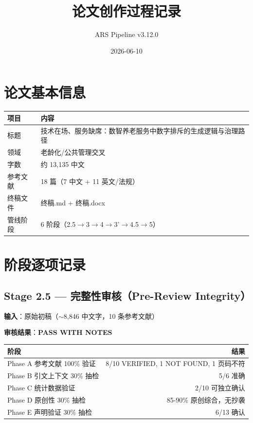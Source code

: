 \documentclass[12pt,a4paper]{article}
\title{论文创作过程记录}
\author{ARS Pipeline v3.12.0}
\date{2026-06-10}
\begin{document}
\maketitle
\tableofcontents
\newpage

\section{论文基本信息}

\begin{tabular}{ll}
\hline
\textbf{项目} & \textbf{内容} \\
\hline
标题 & 技术在场、服务缺席：数智养老服务中数字排斥的生成逻辑与治理路径 \\
领域 & 老龄化/公共管理交叉 \\
字数 & 约 13,135 中文 \\
参考文献 & 18 篇（7 中文 + 11 英文/法规） \\
终稿文件 & 终稿.md + 终稿.docx \\
管线阶段 & 6 阶段（2.5$\rightarrow$3$\rightarrow$4$\rightarrow$3'$\rightarrow$4.5$\rightarrow$5） \\
\hline
\end{tabular}

\section{阶段逐项记录}

\subsection{Stage 2.5 — 完整性审核（Pre-Review Integrity）}

\textbf{输入}：原始初稿（$\sim$8,846 中文字，10 条参考文献）

\textbf{审核结果}：\textbf{PASS WITH NOTES}

\begin{tabular}{lr}
\hline
\textbf{阶段} & \textbf{结果} \\
\hline
Phase A 参考文献 100\% 验证 & 8/10 VERIFIED, 1 NOT FOUND, 1 页码不符 \\
Phase B 引文上下文 30\% 抽检 & 5/6 准确 \\
Phase C 统计数据验证 & 2/10 可独立确认 \\
Phase D 原创性 30\% 抽检 & 85-90\% 原创综合，无抄袭 \\
Phase E 声明验证 30\% 抽检 & 6/13 确认 \\
\hline
\end{tabular}
\end{document}
